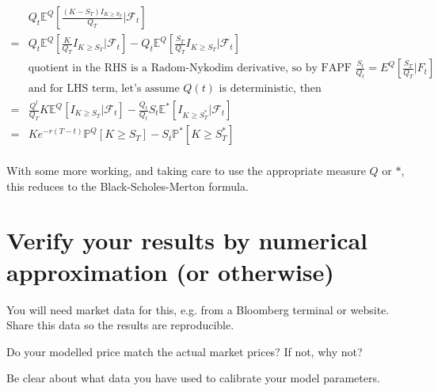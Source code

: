 \documentclass[a4paper]{article}
\begin{document}
\begin{align*}
& Q_t \mathbb{E}^Q[ \frac{  (K - S_T) I_{K \geq S_T} } { Q_T } | \mathcal{F}_t ] \\
= & Q_t \mathbb{E}^Q[ \frac{K} {Q_T} I_{K \geq S_T} | \mathcal{F}_t ] - Q_t \mathbb{E}^Q[ \frac{S_T} {Q_T} I_{K \geq S_T} | \mathcal{F}_t ] \\
& \text{quotient in the RHS is a Radom-Nykodim derivative, so by FAPF $\frac{S_t}{Q_t} = E^Q[\frac{S_T}{Q_T} | F_t]$} \\
& \text{and for LHS term, let's assume $Q(t)$ is deterministic, then} \\
= & \frac{Q^t} {Q_T} K \mathbb{E}^Q[  I_{K \geq S_T} | \mathcal{F}_t ] - \frac{Q_t}{Q_t} S_t \mathbb{E}^{*}[  I_{K \geq S^*_T} | \mathcal{F}_t ] \\
= & K e^{-r(T-t)} \mathbb{P}^Q[K \geq S_T] - S_t \mathbb{P}^{*}[K \geq S^*_T] \\
\end{align*}

With some more working, and taking care to use the appropriate measure $Q$ or $*$, this reduces to the Black-Scholes-Merton formula.

\section{Verify your results by numerical approximation (or otherwise)}

You will need market data for this, e.g. from a Bloomberg terminal or website. Share this data so the results are reproducible.

Do your modelled price match the actual market prices? If not, why not?

Be clear about what data you have used to calibrate your model parameters.
\end{document}

